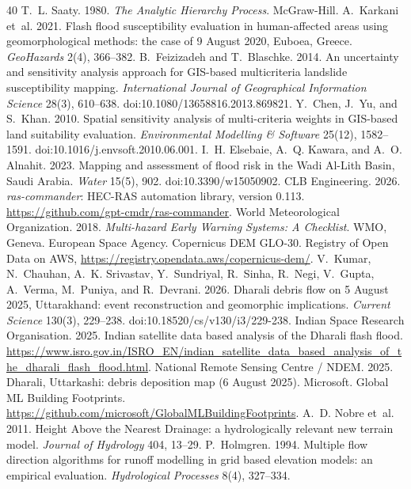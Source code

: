 \documentclass[sigconf,nonacm]{acmart}
\begin{document}
\begin{thebibliography}{40}
 T.~L. Saaty. 1980. \emph{The Analytic Hierarchy Process}. McGraw-Hill.
 A.~Karkani et~al. 2021. Flash flood susceptibility evaluation in human-affected areas using geomorphological methods: the case of 9 August 2020, Euboea, Greece. \emph{GeoHazards} 2(4), 366--382.
 B.~Feizizadeh and T.~Blaschke. 2014. An uncertainty and sensitivity analysis approach for GIS-based multicriteria landslide susceptibility mapping. \emph{International Journal of Geographical Information Science} 28(3), 610--638. doi:10.1080/13658816.2013.869821.
 Y.~Chen, J.~Yu, and S.~Khan. 2010. Spatial sensitivity analysis of multi-criteria weights in GIS-based land suitability evaluation. \emph{Environmental Modelling \& Software} 25(12), 1582--1591. doi:10.1016/j.envsoft.2010.06.001.
 I.~H. Elsebaie, A.~Q. Kawara, and A.~O. Alnahit. 2023. Mapping and assessment of flood risk in the Wadi Al-Lith Basin, Saudi Arabia. \emph{Water} 15(5), 902. doi:10.3390/w15050902.
 CLB Engineering. 2026. \emph{ras-commander}: HEC-RAS automation library, version 0.113. \url{https://github.com/gpt-cmdr/ras-commander}.
 World Meteorological Organization. 2018. \emph{Multi-hazard Early Warning Systems: A Checklist}. WMO, Geneva.
 European Space Agency. Copernicus DEM GLO-30. Registry of Open Data on AWS, \url{https://registry.opendata.aws/copernicus-dem/}.
 V.~Kumar, N.~Chauhan, A.~K. Srivastav, Y.~Sundriyal, R.~Sinha, R.~Negi, V.~Gupta, A.~Verma, M.~Puniya, and R.~Devrani. 2026. Dharali debris flow on 5 August 2025, Uttarakhand: event reconstruction and geomorphic implications. \emph{Current Science} 130(3), 229--238. doi:10.18520/cs/v130/i3/229-238.
 Indian Space Research Organisation. 2025. Indian satellite data based analysis of the Dharali flash flood. \url{https://www.isro.gov.in/ISRO_EN/indian_satellite_data_based_analysis_of_the_dharali_flash_flood.html}.
 National Remote Sensing Centre / NDEM. 2025. Dharali, Uttarkashi: debris deposition map (6 August 2025).
 Microsoft. Global ML Building Footprints. \url{https://github.com/microsoft/GlobalMLBuildingFootprints}.
 A.~D. Nobre et~al. 2011. Height Above the Nearest Drainage: a hydrologically relevant new terrain model. \emph{Journal of Hydrology} 404, 13--29.
 P.~Holmgren. 1994. Multiple flow direction algorithms for runoff modelling in grid based elevation models: an empirical evaluation. \emph{Hydrological Processes} 8(4), 327--334.

\end{thebibliography}
\end{document}
